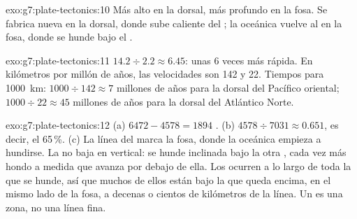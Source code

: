 \begin{solution}{exo:g7:plate-tectonics:10}
Más alto en la dorsal, más profundo en la fosa. Se fabrica  nueva en
la dorsal, donde sube  caliente del ; la  oceánica vuelve al
 en la fosa, donde se hunde bajo el .
\end{solution}

\begin{solution}{exo:g7:plate-tectonics:11}
$14.2 \div 2.2 \approx 6.45$: unas 6 veces más rápida. En
kilómetros por millón de años, las velocidades son 142 y 22. Tiempos para
\qty{1000}{km}: $1000 \div 142 \approx 7$ millones de años para la dorsal
del Pacífico oriental; $1000 \div 22 \approx 45$ millones de años para la
dorsal del Atlántico Norte.
\end{solution}

\begin{solution}{exo:g7:plate-tectonics:12}
(a) $6472 - 4578 = 1894$ . (b) $4578 \div 7031 \approx 0.651$,
es decir, el 65\,\%. (c) La línea del  marca la fosa, donde la 
oceánica empieza a hundirse. La  no baja en vertical: se hunde
inclinada bajo la otra , cada vez más hondo a medida que avanza por
debajo de ella. Los  ocurren a lo largo de toda la  que se
hunde, así que muchos de ellos están bajo la  que queda encima, en el
mismo lado de la fosa, a decenas o cientos de kilómetros de la línea. Un
 es una zona, no una línea fina.
\end{solution}

